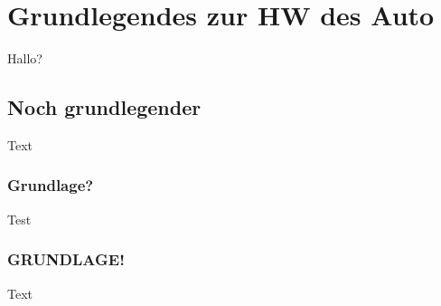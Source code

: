 \section{Grundlegendes zur HW des Auto}
\label{sec:grundlegendesHW}

Hallo?

\subsection{Noch grundlegender}
Text

\subsubsection{Grundlage?}
Test

\subsubsection{GRUNDLAGE!}
Text